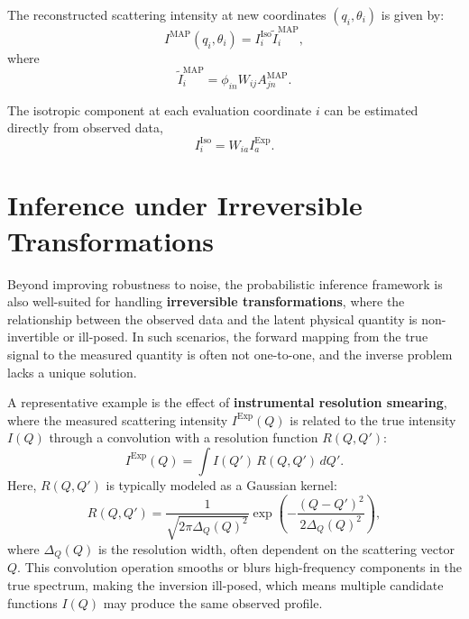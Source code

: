\documentclass[12pt]{article}
\begin{document}
The reconstructed scattering intensity at new coordinates \( (q_i, \theta_i) \) is given by:
\begin{equation}
 I^{\mathrm{MAP}}(q_i, \theta_i) = I^{\mathrm{Iso}}_i\tilde{I}_i^{\mathrm{MAP}},
\end{equation}
where
\begin{equation}
    \tilde{I}_i^{\mathrm{MAP}} = \phi_{in} W_{ij} A_{jn}^{\mathrm{MAP}}.
\end{equation}

The isotropic component at each evaluation coordinate \( i \) can be estimated directly from observed data,
\begin{equation}
    I^{\mathrm{Iso}}_i = W_{ia} I^{\mathrm{Exp}}_a.
\end{equation}

\clearpage
\section{Inference under Irreversible Transformations}
\label{sec:irreversible}

Beyond improving robustness to noise, the probabilistic inference framework is also well-suited for handling \textbf{irreversible transformations}, where the relationship between the observed data and the latent physical quantity is non-invertible or ill-posed. In such scenarios, the forward mapping from the true signal to the measured quantity is often not one-to-one, and the inverse problem lacks a unique solution.

A representative example is the effect of \textbf{instrumental resolution smearing}, where the measured scattering intensity \( I^{\mathrm{Exp}}(Q) \) is related to the true intensity \( I(Q) \) through a convolution with a resolution function \( R(Q, Q') \):
\begin{equation}
    I^{\mathrm{Exp}}(Q) = \int I(Q') \, R(Q, Q') \, dQ'.
    \label{eq:resolution_function}
\end{equation}
Here, \( R(Q, Q') \) is typically modeled as a Gaussian kernel:
\begin{equation}
    R(Q, Q') = \frac{1}{\sqrt{2\pi \Delta_Q(Q)^2}} \exp\left( -\frac{(Q - Q')^2}{2\Delta_Q(Q)^2} \right),
\end{equation}
where \( \Delta_Q(Q) \) is the resolution width, often dependent on the scattering vector \( Q \). This convolution operation smooths or blurs high-frequency components in the true spectrum, making the inversion ill-posed, which means multiple candidate functions \( I(Q) \) may produce the same observed profile.
\end{document}
